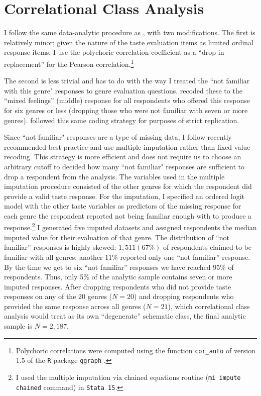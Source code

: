 \documentclass[preprint, authoryear,11pt, 3p]{elsarticle}
\begin{document}
\section{Correlational Class Analysis}
I follow the same data-analytic procedure as \citet{boutyline2017improving}, with two modifications. The first is relatively minor; given the nature of the taste evaluation items as limited ordinal response items, I use the polychoric correlation coefficient as a ``drop-in replacement'' \citep[386]{boutyline2017improving} for the Pearson correlation.\footnote{Polychoric correlations were computed using the function \texttt{cor\_auto} of version 1.5 of the \texttt{R} package \texttt{qgraph} \citep{epskamp2012qgraph}.}

The second is less trivial and has to do with the way I treated the ``not familiar with this genre" responses to genre evaluation questions.  \citet{goldberg2011mapping} recoded these to the ``mixed feelings'' (middle) response for all respondents who offered this response for six genres or less (dropping those who were not familiar with seven or more genres). \citet{boutyline2017improving} followed this same coding strategy for purposes of strict replication. 

Since ``not familiar" responses are a type of missing data, I follow recently recommended best practice and use multiple imputation rather than fixed value recoding. This strategy is more efficient and does not require us to choose an arbitrary cutoff to decided how many ``not familiar" responses are sufficient to drop a respondent from the analysis. The variables used in the multiple imputation procedure consisted of the other genres for which the respondent did provide a valid taste response. For the imputation, I specified an ordered logit model with the other taste variables as predictors of the missing response for each genre the respondent reported not being familiar enough with to produce a response.\footnote{I used the multiple imputation via chained equations routine (\texttt{mi impute chained} command) in \texttt{Stata 15}.} I generated five imputed datasets and assigned respondents the median imputed value for their evaluation of that genre. The distribution of ``not familiar'' responses is highly skewed: $1,511 (67\%)$ of respondents claimed to be familiar with all genres; another $11\%$ reported only one ``not familiar'' response. By the time we get to six ``not familiar'' responses we have reached $95\%$ of respondents. Thus, only 5\% of the analytic sample contains seven or more imputed responses. After dropping respondents who did not provide taste responses on any of the 20 genres ($N = 20$) and dropping respondents who provided the same response across all genres ($N = 21$), which correlational class analysis would treat as its own ``degenerate'' schematic class, the final analytic sample is $N= 2,187$.
\end{document}
